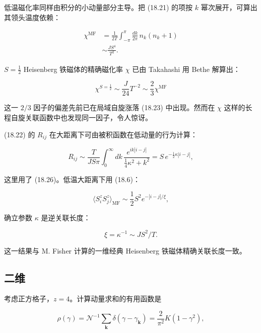 低温磁化率同样由积分的小动量部分主导。把 (18.21) 的项按 $k$ 幂次展开，可算出其领头温度依赖：

\begin{align*}
\chi^ {\mathrm{MF}} & = \frac {1}{2 T} \int_{- \pi} ^ {\pi} \frac {d k}{2 \pi} \, n _ {k} \left( n _ {k} + 1 \right)\\
& \sim \frac {J S ^ {4}}{T ^ {2}}.
\tag{18.27}
\end{align*}

$S = \frac{1}{2}$ Heisenberg 铁磁体的精确磁化率 $\chi$ 已由 Takahashi 用 Bethe 解算出：

\begin{equation*}
\chi^ {S = \frac {1}{2}} \sim \frac {J}{24} T ^ {- 2} \sim \frac {2}{3} \chi^ {\mathrm{MF}}
\tag{18.28}
\end{equation*}

这一 $2/3$ 因子的偏差先前已在局域自旋涨落 (18.23) 中出现。然而在 $\chi$ 这样的长程自旋关联函数中也发现同一因子，令人惊讶。

(18.22) 的 $R_{ij}$ 在大距离下可由被积函数在低动量的行为计算：

\begin{equation*}
R _ {ij} \sim \frac {T}{J S \pi} \int_ {0} ^ {\infty} d k \, \frac {e ^ {i k | i - j |}}{\frac {1}{4} \kappa^ {2} + k ^ {2}} = S \, e ^ {- \frac {1}{2} \kappa | i - j |} ,
\tag{18.29}
\end{equation*}

这里用了 (18.26)。低温大距离下用 (18.6)：

\begin{equation*}
\langle S _ {i} ^ {z} S _ {j} ^ {z} \rangle_{\mathrm{MF}} \sim \frac {1}{2} S ^ {2} e ^ {- | i - j | / \xi} ,
\tag{18.30}
\end{equation*}

确立参数 $\kappa$ 是逆关联长度：

\begin{equation*}
\xi = \kappa^ {- 1} \sim J S ^ {2} / T.
\tag{18.31}
\end{equation*}

这一结果与 M. Fisher 计算的一维经典 Heisenberg 铁磁体精确关联长度一致。

\subsection{二维}

考虑正方格子，$z = 4$。计算动量求和的有用函数是

\begin{equation*}
\rho ( \gamma ) = \mathcal {N} ^ {- 1} \sum_ {\mathbf {k}} \delta \left( \gamma - \gamma_ {\mathbf {k}} \right) = \frac {2}{\pi^ {2}} K \left( 1 - \gamma^ {2} \right) ,
\tag{18.32}
\end{equation*}

